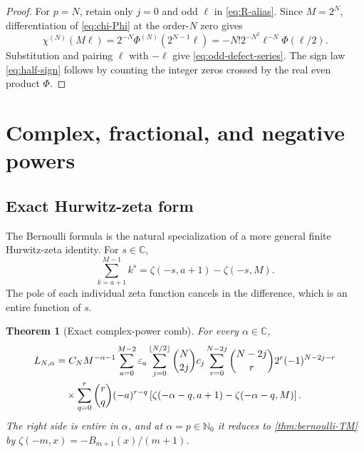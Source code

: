 \documentclass[11pt,oneside]{article}
\numberwithin{equation}{section}
\newtheorem{theorem}{Theorem}[section]
\theoremstyle{definition}
\theoremstyle{remark}
\newcommand{\C}{\mathbb C}
\newcommand{\N}{\mathbb N}
\begin{document}
\begin{proof}
For \(p=N\), retain only \(j=0\) and odd \(\ell\) in \eqref{eq:R-alias}.  Since
\(M=2^N\), differentiation of \eqref{eq:chi-Phi} at the order-\(N\) zero gives
\[
 \chi^{(N)}(M\ell)=2^{-N}\Phi^{(N)}(2^{N-1}\ell)
 =-N!2^{-N^2}\ell^{-N}\Phi(\ell/2).
\]
Substitution and pairing \(\ell\) with \(-\ell\) give
\eqref{eq:odd-defect-series}.  The sign law \eqref{eq:half-sign} follows by counting the
integer zeros crossed by the real even product \(\Phi\).
\end{proof}

\begin{table}[H]
\centering
\small
\resizebox{0.92\textwidth}{!}{}
\caption{Exact first defects through level eight.  The table supports the exact-precision
conjecture in Conjecture~\ref{conj:exact-degree}.}
\label{tab:first-defects}
\end{table}

\begin{table}[H]
\centering
\small
\resizebox{\textwidth}{!}{}
\caption{Exact rational check of \eqref{eq:EM-collapse}.  A check mark means that the
complete Euler--Maclaurin polynomial equals the direct dyadic sum exactly.}
\label{tab:exactness-matrix}
\end{table}

\section{Complex, fractional, and negative powers}
\label{sec:complex}

\subsection{Exact Hurwitz-zeta form}

The Bernoulli formula is the natural specialization of a more general finite Hurwitz-zeta
identity.  For \(s\in\C\),
\begin{equation}
 \sum_{k=a+1}^{M-1}k^s
 =\zeta(-s,a+1)-\zeta(-s,M).
 \label{eq:Hurwitz-finite}
\end{equation}
The pole of each individual zeta function cancels in the difference, which is an entire
function of \(s\).

\begin{theorem}[Exact complex-power comb]
\label{thm:Hurwitz-comb}
For every \(\alpha\in\C\),
\begin{align}
 L_{N,\alpha}
 &=C_NM^{-\alpha-1}
 \sum_{a=0}^{M-2}\varepsilon_a
 \sum_{j=0}^{\lfloor N/2\rfloor}\binom N{2j}c_j
 \sum_{r=0}^{N-2j}\binom{N-2j}{r}2^r(-1)^{N-2j-r}
 \notag\\
 &\quad\times
 \sum_{q=0}^{r}\binom rq(-a)^{r-q}
 \left[
 \zeta(-\alpha-q,a+1)-\zeta(-\alpha-q,M)
 \right].
 \label{eq:Hurwitz-comb}
\end{align}
The right side is entire in \(\alpha\), and at \(\alpha=p\in\N_0\) it reduces to
\cref{thm:bernoulli-TM} by
\(
 \zeta(-m,x)=-B_{m+1}(x)/(m+1)
\).
\end{theorem}
\end{document}
